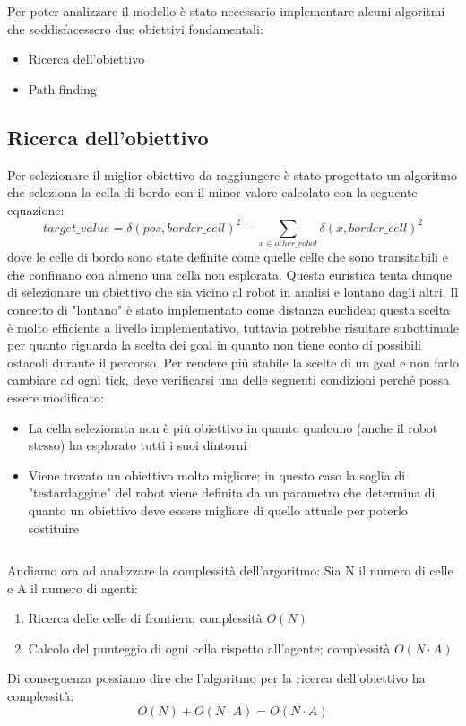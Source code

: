 Per poter analizzare il modello è stato necessario implementare alcuni algoritmi
che soddisfacessero due obiettivi fondamentali:
\begin{itemize}
  \item Ricerca dell'obiettivo
  \item Path finding
\end{itemize}

\subsection{Ricerca dell'obiettivo}
  Per selezionare il miglior obiettivo da raggiungere è stato progettato un algoritmo
  che seleziona la cella di bordo con il minor valore calcolato con la seguente
  equazione:
  $$target\_value = \delta(pos, border\_cell)^2 - \sum _{x \in other\_robot}{\delta(x,border\_cell)^2}$$
  dove le celle di bordo sono state definite come quelle celle che sono transitabili e che confinano con almeno una cella 
  non esplorata.
  Questa euristica tenta dunque di selezionare un obiettivo che sia vicino al robot in analisi e lontano dagli altri.
  Il concetto di "lontano" è stato implementato come distanza euclidea; questa scelta è molto efficiente a livello
  implementativo, tuttavia potrebbe risultare subottimale per quanto riguarda la scelta dei goal in quanto non tiene
  conto di possibili ostacoli durante il percorso.
  Per rendere più stabile la scelte di un goal e non farlo cambiare ad ogni tick, deve verificarsi una delle seguenti condizioni perché possa essere modificato:

  \begin{itemize}
    \item La cella selezionata non è più obiettivo in quanto qualcuno (anche il robot stesso) ha esplorato tutti 
          i suoi dintorni
    \item Viene trovato un obiettivo molto migliore; in questo caso la soglia di "testardaggine" del robot viene definita da un
        parametro che determina di quanto un obiettivo deve essere migliore di quello attuale per poterlo sostituire
  \end{itemize}
  \newpage
  \renewcommand{\fcolorbox}[4][]{#4}
  \inputminted[linenos,fontsize=\footnotesize]{python}{algoritmi/goal.py}
    Andiamo ora ad analizzare la complessità dell'argoritmo: Sia N il numero di 
    celle e A il numero di agenti:
    \begin{enumerate}
      \item Ricerca delle celle di frontiera; complessità $O(N)$
      \item Calcolo del punteggio di ogni cella rispetto all'agente; complessità $O(N\cdot A)$
    \end{enumerate}
    Di conseguenza possiamo dire che l'algoritmo per la ricerca dell'obiettivo ha complessità:
    $$O(N) + O(N \cdot A) = O(N \cdot A)$$
  \newpage
